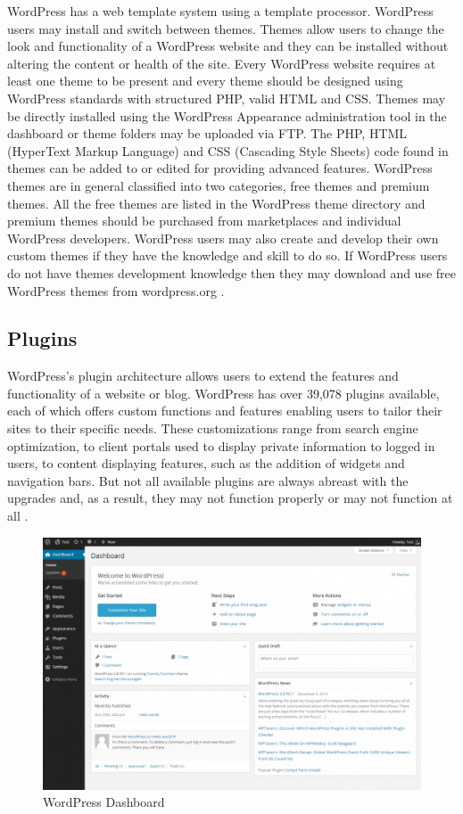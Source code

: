 WordPress has a web template system using a template processor.
WordPress users may install and switch between themes. Themes allow users to change the look and functionality of a WordPress website and they can be installed without altering the content or health of the site. Every WordPress website requires at least one theme to be present and every theme should be designed using WordPress standards with structured PHP, valid HTML and CSS. Themes may be directly installed using the WordPress Appearance administration tool in the dashboard or theme folders may be uploaded via FTP. The PHP, HTML (HyperText Markup Language) and CSS (Cascading Style Sheets) code found in themes can be added to or edited for providing advanced features. WordPress themes are in general classified into two categories, free themes and premium themes. All the free themes are listed in the WordPress theme directory and premium themes should be purchased from marketplaces and individual WordPress developers. WordPress users may also create and develop their own custom themes if they have the knowledge and skill to do so. If WordPress users do not have themes development knowledge then they may download and use free WordPress themes from wordpress.org \cite{cms_wp}. 

\subsection{Plugins}
\label{subsec:wp_plugins}


WordPress's plugin architecture allows users to extend the features and functionality of a website or blog. WordPress has over 39,078 plugins available, each of which offers custom functions and features enabling users to tailor their sites to their specific needs. These customizations range from search engine optimization, to client portals used to display private information to logged in users, to content displaying features, such as the addition of widgets and navigation bars. But not all available plugins are always abreast with the upgrades and, as a result, they may not function properly or may not function at all \cite{cms_wp}.



\begin {figure}[h]
\graphicspath{{images/chapter_cms/}}
\includegraphics[width=\textwidth]{wp_dash}
\caption{WordPress Dashboard}
\end {figure}
